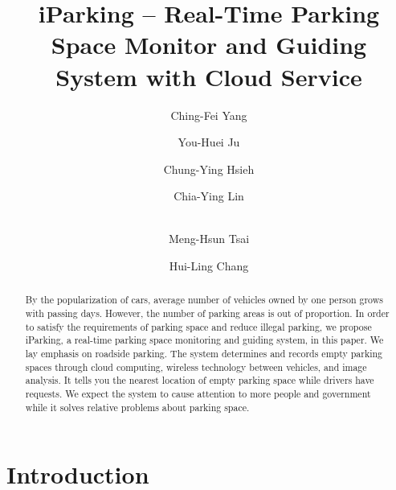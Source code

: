 \documentclass[runningheads,a4paper]{llncs}
\begin{document}


\title{iParking -- Real-Time Parking Space Monitor and Guiding System with Cloud Service}

\author{Ching-Fei Yang \and You-Huei Ju \and Chung-Ying Hsieh \and
Chia-Ying Lin \and \\ Meng-Hsun Tsai \and Hui-Ling Chang}
{}

\maketitle

\begin{abstract}
By the popularization of cars, average number of vehicles owned by one person
grows with passing days. However, the number of parking areas is out of
proportion. In order to satisfy the requirements of parking space and
reduce illegal parking, we propose iParking, a real-time parking space
monitoring and guiding system, in this paper.
We lay emphasis on roadside parking. The system determines and records
empty parking spaces through cloud computing, wireless technology
between vehicles, and image analysis. It tells you the nearest location
of empty parking space while drivers have requests. We expect the system
to cause attention to more people and government while it solves relative
problems about parking space.
\end{abstract}


\section{Introduction}\label{sec:intro}
\end{document}
